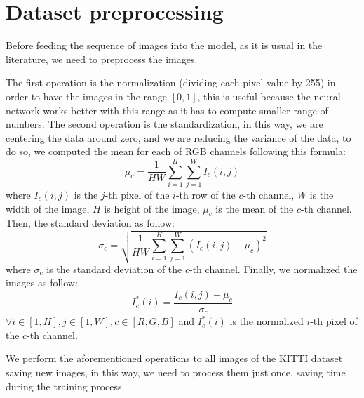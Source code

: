 \section{Dataset preprocessing}\label{sec:dataset-preprocessing}

Before feeding the sequence of images into the model, as it is usual in the literature, we need to preprocess the images.

The first operation is the normalization (dividing each pixel value by 255) in order to have the images in the range $[0,1]$, this is useful because the neural network works better with this range as it has to compute smaller range of numbers.
The second operation is the standardization, in this way, we are centering the data around zero, and we are reducing the variance of the data, to do so, we computed the mean for each of RGB channels following this formula:
\begin{equation}
    \mu_{c} = \frac{1}{HW}\sum_{i=1}^{H}\sum_{j=1}^{W}I_{c}(i, j)
    \label{eq:equation_mean}
\end{equation}
where $I_{c}(i, j)$ is the $j$-th pixel of the $i$-th row of the $c$-th channel, $W$ is the width of the image, $H$ is height of the image, $\mu_{c}$ is the mean of the $c$-th channel.
Then, the standard deviation as follow:
\begin{equation}
    \sigma_{c} = \sqrt{\frac{1}{HW}\sum_{i=1}^{H}\sum_{j=1}^{W} (I_{c}(i,j) - \mu_{c})^{2}}
    \label{eq:equation_std_dev}
\end{equation}
where $\sigma_{c}$ is the standard deviation of the $c$-th channel.
Finally, we normalized the images as follow:
\begin{equation}
    I^*_{c}(i) = \frac{I_{c}(i,j) - \mu_{c}}{\sigma_{c}}
    \label{eq:equation_normalization}
\end{equation}
$\forall i \in [1, H], j \in [1, W], c \in [R, G, B]$ and $I^*_{c}(i)$ is the normalized $i$-th pixel of the $c$-th channel.

We perform the aforementioned operations to all images of the KITTI dataset saving new images, in this way, we need to process them just once, saving time during the training process.


